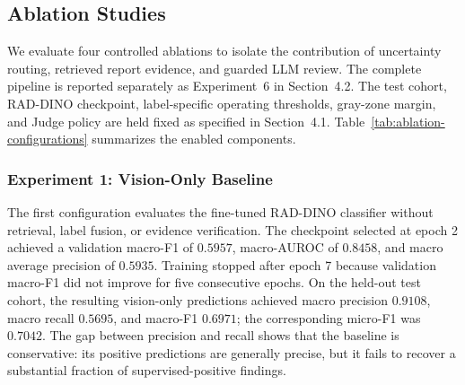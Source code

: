 \subsection{Ablation Studies}
\label{sec:ablation-studies}

We evaluate four controlled ablations to isolate the contribution of uncertainty routing, retrieved report evidence, and guarded LLM review. The complete pipeline is reported separately as Experiment~6 in Section~4.2. The test cohort, RAD-DINO checkpoint, label-specific operating thresholds, gray-zone margin, and Judge policy are held fixed as specified in Section~4.1. Table~\ref{tab:ablation-configurations} summarizes the enabled components.

\begin{table}[H]
\centering
\caption{Components enabled in the four ablation configurations. ``Gray $\rightarrow$ uncertain'' replaces every gray-zone prediction with an uncertain status without using retrieved evidence.}
\label{tab:ablation-configurations}
\end{table}

\subsubsection{Experiment 1: Vision-Only Baseline}

The first configuration evaluates the fine-tuned RAD-DINO classifier without retrieval, label fusion, or evidence verification. The checkpoint selected at epoch 2 achieved a validation macro-F1 of $0.5957$, macro-AUROC of $0.8458$, and macro average precision of $0.5935$. Training stopped after epoch 7 because validation macro-F1 did not improve for five consecutive epochs. On the held-out test cohort, the resulting vision-only predictions achieved macro precision $0.9108$, macro recall $0.5695$, and macro-F1 $0.6971$; the corresponding micro-F1 was $0.7042$. The gap between precision and recall shows that the baseline is conservative: its positive predictions are generally precise, but it fails to recover a substantial fraction of supervised-positive findings.

